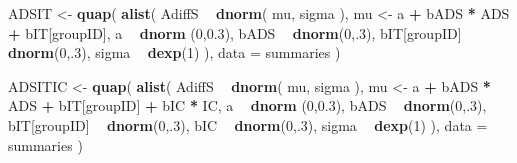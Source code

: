 \documentclass[10pt,dvipsnames,enabledeprecatedfontcommands]{scrartcl}
\newenvironment{Shaded}{\begin{snugshade}}{\end{snugshade}}
\newcommand{\KeywordTok}[1]{\textcolor[rgb]{0.13,0.29,0.53}{\textbf{#1}}}
\newcommand{\DataTypeTok}[1]{\textcolor[rgb]{0.13,0.29,0.53}{#1}}
\newcommand{\DecValTok}[1]{\textcolor[rgb]{0.00,0.00,0.81}{#1}}
\newcommand{\FloatTok}[1]{\textcolor[rgb]{0.00,0.00,0.81}{#1}}
\newcommand{\StringTok}[1]{\textcolor[rgb]{0.31,0.60,0.02}{#1}}
\newcommand{\OperatorTok}[1]{\textcolor[rgb]{0.81,0.36,0.00}{\textbf{#1}}}
\newcommand{\NormalTok}[1]{#1}
\begin{document}
\begin{Shaded}
\begin{Highlighting}[]
\NormalTok{ADSIT <-}\StringTok{ }\KeywordTok{quap}\NormalTok{(}
  \KeywordTok{alist}\NormalTok{(}
\NormalTok{    AdiffS }\OperatorTok{~}\StringTok{ }\KeywordTok{dnorm}\NormalTok{( mu, sigma ),}
\NormalTok{    mu <-}\StringTok{ }\NormalTok{a }\OperatorTok{+}\StringTok{ }\NormalTok{bADS }\OperatorTok{*}\StringTok{ }\NormalTok{ADS }\OperatorTok{+}\StringTok{  }\NormalTok{bIT[groupID],}
\NormalTok{    a }\OperatorTok{~}\StringTok{ }\KeywordTok{dnorm}\NormalTok{ (}\DecValTok{0}\NormalTok{,}\FloatTok{0.3}\NormalTok{),}
\NormalTok{    bADS }\OperatorTok{~}\StringTok{ }\KeywordTok{dnorm}\NormalTok{(}\DecValTok{0}\NormalTok{,.}\DecValTok{3}\NormalTok{),}
\NormalTok{    bIT[groupID] }\OperatorTok{~}\StringTok{ }\KeywordTok{dnorm}\NormalTok{(}\DecValTok{0}\NormalTok{,.}\DecValTok{3}\NormalTok{),}
\NormalTok{    sigma  }\OperatorTok{~}\StringTok{ }\KeywordTok{dexp}\NormalTok{(}\DecValTok{1}\NormalTok{)}
\NormalTok{  ), }
  \DataTypeTok{data =}\NormalTok{ summaries}
\NormalTok{)}


\NormalTok{ADSITIC <-}\StringTok{ }\KeywordTok{quap}\NormalTok{(}
  \KeywordTok{alist}\NormalTok{(}
\NormalTok{    AdiffS }\OperatorTok{~}\StringTok{ }\KeywordTok{dnorm}\NormalTok{( mu, sigma ),}
\NormalTok{    mu <-}\StringTok{ }\NormalTok{a }\OperatorTok{+}\StringTok{ }\NormalTok{bADS }\OperatorTok{*}\StringTok{ }\NormalTok{ADS }\OperatorTok{+}\StringTok{  }\NormalTok{bIT[groupID] }\OperatorTok{+}\StringTok{ }\NormalTok{bIC }\OperatorTok{*}\StringTok{ }\NormalTok{IC,}
\NormalTok{    a }\OperatorTok{~}\StringTok{ }\KeywordTok{dnorm}\NormalTok{ (}\DecValTok{0}\NormalTok{,}\FloatTok{0.3}\NormalTok{),}
\NormalTok{    bADS }\OperatorTok{~}\StringTok{ }\KeywordTok{dnorm}\NormalTok{(}\DecValTok{0}\NormalTok{,.}\DecValTok{3}\NormalTok{),}
\NormalTok{    bIT[groupID] }\OperatorTok{~}\StringTok{ }\KeywordTok{dnorm}\NormalTok{(}\DecValTok{0}\NormalTok{,.}\DecValTok{3}\NormalTok{),}
\NormalTok{    bIC }\OperatorTok{~}\StringTok{ }\KeywordTok{dnorm}\NormalTok{(}\DecValTok{0}\NormalTok{,.}\DecValTok{3}\NormalTok{),}
\NormalTok{    sigma  }\OperatorTok{~}\StringTok{ }\KeywordTok{dexp}\NormalTok{(}\DecValTok{1}\NormalTok{)}
\NormalTok{  ), }
  \DataTypeTok{data =}\NormalTok{ summaries}
\NormalTok{)}



\end{Highlighting}
\end{Shaded}
\end{document}
